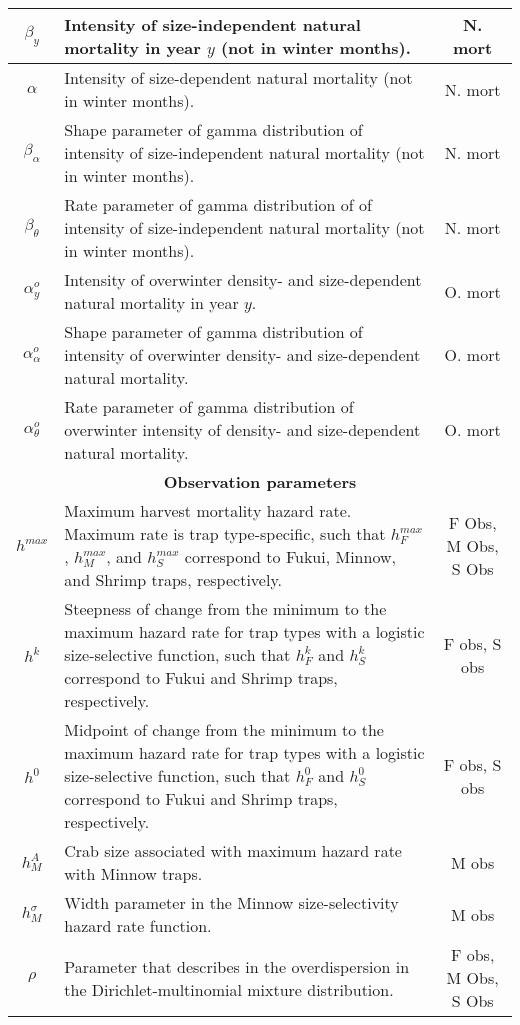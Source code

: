 \documentclass{article}
\begin{document}
\begin{longtable}{||c p{9cm} c||}
 \hline
 $\beta_y$ & Intensity of size-independent natural mortality in year $y$ (not in winter months). & N. mort \\ 
 \hline
 $\alpha$ & Intensity of size-dependent natural mortality (not in winter months). & N. mort \\ 
 \hline
 $\beta_{\alpha}$ & Shape parameter of gamma distribution of intensity of size-independent natural mortality (not in winter months). & N. mort \\ 
 \hline
 $\beta_{\theta}$ & Rate parameter of gamma distribution of of intensity of size-independent natural mortality (not in winter months). & N. mort \\ 
 \hline
 $\alpha^o_y$ & Intensity of overwinter density- and size-dependent natural mortality in year $y$. & O. mort \\ 
 \hline
 $\alpha^o_{\alpha}$ & Shape parameter of gamma distribution of intensity of overwinter density- and size-dependent natural mortality. & O. mort \\ 
 \hline
 $\alpha^o_{\theta}$ & Rate parameter of gamma distribution of overwinter intensity of density- and size-dependent natural mortality. & O. mort \\ 
 \hline\hline
 \multicolumn{3}{||c||}{\textbf{Observation parameters}} \\ 
 \hline
 $h^{max}$ & Maximum harvest mortality hazard rate. Maximum rate is trap type-specific, such that $h_F^{max}$, $h_M^{max}$, and $h_S^{max}$ correspond to Fukui, Minnow, and Shrimp traps, respectively. & F Obs, M Obs, S Obs \\ 
 \hline
 $h^{k}$ & Steepness of change from the minimum to the maximum hazard rate for trap types with a logistic size-selective function, such that $h_F^{k}$ and $h_S^{k}$ correspond to Fukui and Shrimp traps, respectively. & F obs, S obs \\ 
 \hline
 $h^{0}$ & Midpoint of change from the minimum to the maximum hazard rate for trap types with a logistic size-selective function, such that $h_F^{0}$ and $h_S^{0}$ correspond to Fukui and Shrimp traps, respectively. & F obs, S obs \\ 
 \hline
 $h_M^{A}$ & Crab size associated with maximum hazard rate with Minnow traps. & M obs \\ 
 \hline
 $h_M^{\sigma}$ & Width parameter in the Minnow size-selectivity hazard rate function. & M obs \\ 
 \hline
 $\rho$ & Parameter that describes in the overdispersion in the Dirichlet-multinomial mixture distribution. & F obs, M Obs, S Obs \\

\end{longtable}
\end{document}
